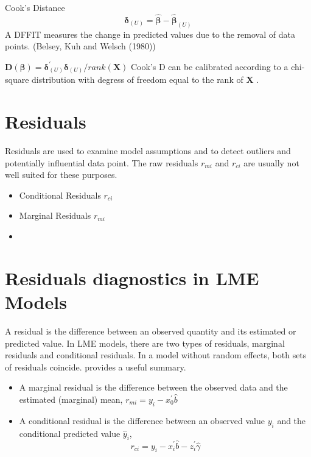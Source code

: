 \documentclass[12pt, a4paper]{report}
\theoremstyle{plain}
\theoremstyle{definition}
\theoremstyle{remark}
\begin{document}
Cook's Distance
\[ \boldsymbol{\delta}_{(U)} = \boldsymbol{\hat{\beta}}  - \boldsymbol{\hat{\beta}}_{(U)} \]
A DFFIT measures the change in predicted values due to the removal of data points.
(Belsey, Kuh and Welsch (1980))

$\boldsymbol{D(\beta)}  = \boldsymbol{\delta}^{\prime}_{(U)} \boldsymbol{\delta}_{(U)} / rank(\boldsymbol{X})$
Cook's D can be calibrated according to a chi-square distribution with degress of freedom equal to the rank of $\boldsymbol{X}$ \citet{CPJ}.



	\section*{Residuals}
	
	Residuals are used to examine model assumptions and to detect outliers and potentially influential data
	point. The raw residuals $r_{mi}$ and $r_{ci}$ are usually not well suited for these purposes.
	
	\begin{itemize}
		\item Conditional Residuals $r_{ci}$
		\item Marginal Residuals $r_{mi}$
		\item 
	\end{itemize}
	
	
	
	
	
	\section{Residuals diagnostics in LME Models}
	
	
	A residual is the difference between an observed quantity and its
	estimated or predicted value. In LME models, there are two types
	of residuals, marginal residuals and conditional residuals. 
	In a model without random effects, both sets of residuals coincide.
	\citet{schabenberger} provides a useful summary. 
	
	\begin{itemize}
		\item A marginal residual is the difference between the observed data and the estimated (marginal) mean, $r_{mi} = y_i - x_0^{\prime} \hat{b}$
		\item A conditional residual is the difference between an observed value $y_{i}$ and the conditional predicted value $\hat{y}_{i} $,
		\[r_{ci} = y_i - x_i^{\prime} \hat{b} - z_i^{\prime} \hat{\gamma}\]
	\end{itemize} 
	
\end{document}
